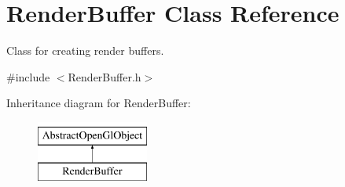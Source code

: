 \hypertarget{class_render_buffer}{\section{Render\-Buffer Class Reference}
\label{class_render_buffer}
}


Class for creating render buffers.  




{\ttfamily \#include $<$Render\-Buffer.\-h$>$}

Inheritance diagram for Render\-Buffer\-:\begin{figure}[H]
\begin{center}
\leavevmode
\includegraphics[height=2.000000cm]{class_render_buffer}
\end{center}
\end{figure}
